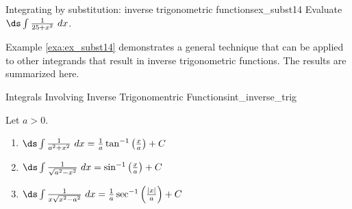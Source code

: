 \begin{example}{Integrating by substitution: inverse trigonometric functions}{ex_subst14}
{
Evaluate $\ds \int \frac{1}{25+x^2}\ dx$.}
\end{example}




Example \ref{exa:ex_subst14} demonstrates a general technique that can be applied to other integrands that result in inverse trigonometric functions. The results are summarized here.


\begin{theorem}{Integrals Involving Inverse Trigonomentric Functions}{int_inverse_trig}
{Let $a>0$.
\begin{enumerate}
\item		$\ds \int \frac{1}{a^2+x^2}\ dx = \frac1a\tan^{-1}\left(\frac{x}{a}\right) + C$
\item		$\ds \int \frac{1}{\sqrt{a^2-x^2}}\ dx = \sin^{-1}\left(\frac{x}{a}\right)+C$
\item		$\ds \int \frac{1}{x\sqrt{x^2-a^2}}\ dx = \frac1a\sec^{-1}\left(\frac{|x|}{a}\right)+C$
\end{enumerate}
}
\end{theorem}


